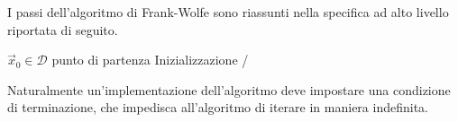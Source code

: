 I passi dell'algoritmo di Frank-Wolfe sono riassunti nella specifica ad alto livello riportata di seguito.
\begin{tcolorbox}[
    enhanced,
    borderline south = {0.5mm}{0pt}{primary},
    frame hidden,
    colback=white, %
    colbacktitle=primary, %
    boxrule=0pt,   %
    sharp corners, %
    left=1pt,
    top=1pt,
    bottom=1pt,
    adjusted title = Algoritmo di Frank-Wolfe,
    halign title = center,
    fonttitle = \alt\fontseries{mid}\selectfont,
]
\begin{algorithm}[H]
    $ \vec{x}_0 \in \mathcal{D} $ punto di partenza \hfill {\alt {\ttfamily /*}  Inizializzazione {\ttfamily */}} \\[10pt]
\end{algorithm}
\end{tcolorbox}
\noindent
Naturalmente un'implementazione dell'algoritmo deve impostare una condizione di terminazione, che impedisca
all'algoritmo di iterare in maniera indefinita.
